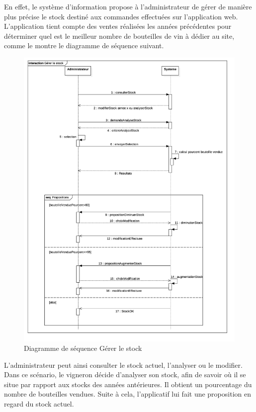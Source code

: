 \documentclass[a4paper, titlepage]{report}
\begin{document}
En effet, le système d'information propose à l'administrateur de gérer
de manière plus précise le stock destiné aux commandes effectuées sur
l'application web. L'application tient compte des ventes réalisées les
années précédentes pour déterminer quel est le meilleur nombre de
bouteilles de vin à dédier au site, comme le montre le diagramme de
séquence suivant.

\clearpage
\begin{figure}[!h]
\centering
\includegraphics{Images/SequenceDiagramGererStock.jpg}
\caption{Diagramme de séquence Gérer le stock}
\end{figure}

L'administrateur peut ainsi consulter le stock actuel, l'analyser ou le
modifier. Dans ce scénario, le vigneron décide d'analyser son stock,
afin de savoir où il se situe par rapport aux stocks des années
antérieures. Il obtient un pourcentage du nombre de bouteilles vendues.
Suite à cela, l'applicatif lui fait une proposition en regard du stock
actuel.
\end{document}
